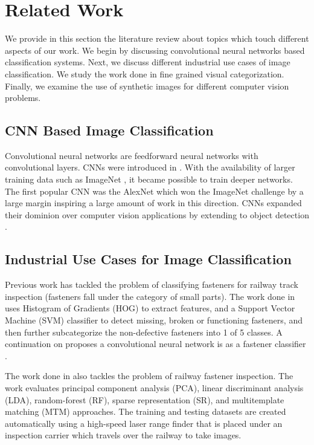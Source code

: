 \chapter{Related Work}
We provide in this section the literature review about topics which touch different aspects of our work. We begin by discussing convolutional neural networks based classification systems. Next, we discuss different industrial use cases of image classification. We study the work done in fine grained visual categorization. Finally, we examine the use of synthetic images for different computer vision problems.

\section{CNN Based Image Classification}

Convolutional neural networks are feedforward neural networks with convolutional layers. CNNs were introduced in \cite{lecun1998gradient}. With the availability of larger training data such as ImageNet \cite{deng2009imagenet}, it became possible to train deeper networks. The first popular CNN was the AlexNet \cite{krizhevsky2012imagenet} which won the ImageNet challenge by a large margin inspiring a large amount of work in this direction. CNNs expanded their dominion over computer vision applications by extending to object detection \cite{girshick2014rich} \cite{ren2015faster}.

\section{Industrial Use Cases for Image Classification}

Previous work has tackled the problem of classifying fasteners for railway track inspection (fasteners fall under the category of small parts). The work done in \cite{gibert2015robust} uses Histogram of Gradients (HOG) to extract features, and a Support Vector Machine (SVM) classifier to detect missing, broken or functioning fasteners, and then further subcategorize the non-defective fasteners into 1 of 5 classes. A continuation on \cite{gibert2015robust} proposes a convolutional neural network is as a fastener classifier \cite{gibert2017deep}.

The work done in \cite{aytekin2015railway} also tackles the problem of railway fastener inspection. The work evaluates principal component analysis (PCA), linear discriminant analysis (LDA), random-forest (RF), sparse representation (SR), and multitemplate matching (MTM) approaches. The training and testing datasets are created automatically using a high-speed laser range finder that is placed under an inspection carrier which travels over the railway to take images.

